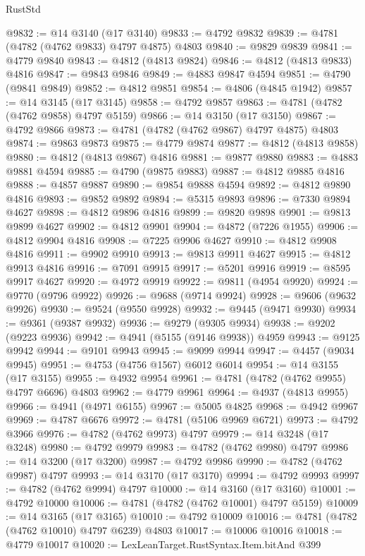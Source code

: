 \begin{lexlean}{RustStd}
\begin{coremodule}
@9832 := @14 @3140 (@17 @3140)
@9833 := @4792 @9832
@9839 := @4781 (@4782 (@4762 @9833) @4797 @4875) @4803
@9840 := @9829 @9839
@9841 := @4779 @9840
@9843 := @4812 (@4813 @9824)
@9846 := @4812 (@4813 @9833) @4816
@9847 := @9843 @9846
@9849 := @4883 @9847 @4594
@9851 := @4790 (@9841 @9849)
@9852 := @4812 @9851
@9854 := @4806 (@4845 @1942)
@9857 := @14 @3145 (@17 @3145)
@9858 := @4792 @9857
@9863 := @4781 (@4782 (@4762 @9858) @4797 @5159)
@9866 := @14 @3150 (@17 @3150)
@9867 := @4792 @9866
@9873 := @4781 (@4782 (@4762 @9867) @4797 @4875) @4803
@9874 := @9863 @9873
@9875 := @4779 @9874
@9877 := @4812 (@4813 @9858)
@9880 := @4812 (@4813 @9867) @4816
@9881 := @9877 @9880
@9883 := @4883 @9881 @4594
@9885 := @4790 (@9875 @9883)
@9887 := @4812 @9885 @4816
@9888 := @4857 @9887
@9890 := @9854 @9888 @4594
@9892 := @4812 @9890 @4816
@9893 := @9852 @9892
@9894 := @5315 @9893
@9896 := @7330 @9894 @4627
@9898 := @4812 @9896 @4816
@9899 := @9820 @9898
@9901 := @9813 @9899 @4627
@9902 := @4812 @9901
@9904 := @4872 (@7226 @1955)
@9906 := @4812 @9904 @4816
@9908 := @7225 @9906 @4627
@9910 := @4812 @9908 @4816
@9911 := @9902 @9910
@9913 := @9813 @9911 @4627
@9915 := @4812 @9913 @4816
@9916 := @7091 @9915
@9917 := @5201 @9916
@9919 := @8595 @9917 @4627
@9920 := @4972 @9919
@9922 := @9811 (@4954 @9920)
@9924 := @9770 (@9796 @9922)
@9926 := @9688 (@9714 @9924)
@9928 := @9606 (@9632 @9926)
@9930 := @9524 (@9550 @9928)
@9932 := @9445 (@9471 @9930)
@9934 := @9361 (@9387 @9932)
@9936 := @9279 (@9305 @9934)
@9938 := @9202 (@9223 @9936)
@9942 := @4941 (@5155 (@9146 @9938)) @4959
@9943 := @9125 @9942
@9944 := @9101 @9943
@9945 := @9099 @9944
@9947 := @4457 (@9034 @9945)
@9951 := @4753 (@4756 @1567) @6012 @6014
@9954 := @14 @3155 (@17 @3155)
@9955 := @4932 @9954
@9961 := @4781 (@4782 (@4762 @9955) @4797 @6696) @4803
@9962 := @4779 @9961
@9964 := @4937 (@4813 @9955)
@9966 := @4941 (@4971 @6155)
@9967 := @5005 @4825
@9968 := @4942 @9967
@9969 := @4787 @6676
@9972 := @4781 (@5106 @9969 @6721)
@9973 := @4792 @3966
@9976 := @4782 (@4762 @9973) @4797
@9979 := @14 @3248 (@17 @3248)
@9980 := @4792 @9979
@9983 := @4782 (@4762 @9980) @4797
@9986 := @14 @3200 (@17 @3200)
@9987 := @4792 @9986
@9990 := @4782 (@4762 @9987) @4797
@9993 := @14 @3170 (@17 @3170)
@9994 := @4792 @9993
@9997 := @4782 (@4762 @9994) @4797
@10000 := @14 @3160 (@17 @3160)
@10001 := @4792 @10000
@10006 := @4781 (@4782 (@4762 @10001) @4797 @5159)
@10009 := @14 @3165 (@17 @3165)
@10010 := @4792 @10009
@10016 := @4781 (@4782 (@4762 @10010) @4797 @6239) @4803
@10017 := @10006 @10016
@10018 := @4779 @10017
@10020 := LexLeanTarget.RustSyntax.Item.bitAnd @399

\end{coremodule}
\end{lexlean}
